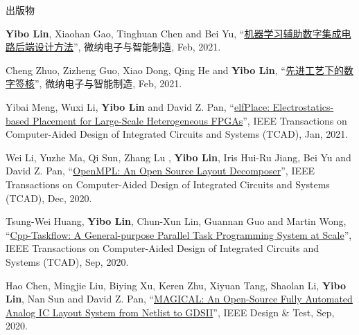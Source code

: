 \begin{rSection}{出版物}
\begin{description}[font=\normalfont, rightmargin=2em]
{}
            

\item[{[J29]}]{
        \textbf{Yibo Lin}, Xiaohan Gao, Tinghuan Chen and Bei Yu, 
    ``\href{https://doi.org/10.19816/j.cnki.10-1594/tn.2021.02.011}{机器学习辅助数字集成电路后端设计方法}'', 
    微纳电子与智能制造, Feb, 2021.
    
}
            

\item[{[J28]}]{
        Cheng Zhuo, Zizheng Guo, Xiao Dong, Qing He and \textbf{Yibo Lin}, 
    ``\href{https://doi.org/ 10.19816/j.cnki.10-1594/tn.2021.02.001}{先进工艺下的数字签核}'', 
    微纳电子与智能制造, Feb, 2021.
    
}
            

\item[{[J27]}]{
        Yibai Meng, Wuxi Li, \textbf{Yibo Lin} and David Z. Pan, 
    ``\href{https://doi.org/10.1109/TCAD.2021.3053191}{elfPlace: Electrostatics-based Placement for Large-Scale Heterogeneous FPGAs}'', 
    IEEE Transactions on Computer-Aided Design of Integrated Circuits and Systems (TCAD), Jan, 2021.
    
}
            

\item[{[J26]}]{
        Wei Li, Yuzhe Ma, Qi Sun,  Zhang Lu , \textbf{Yibo Lin}, Iris Hui-Ru Jiang, Bei Yu and David Z. Pan, 
    ``\href{https://doi.org/10.1109/TCAD.2020.3042175}{OpenMPL: An Open Source Layout Decomposer}'', 
    IEEE Transactions on Computer-Aided Design of Integrated Circuits and Systems (TCAD), Dec, 2020.
    
}
            

\item[{[J25]}]{
        Tsung-Wei Huang, \textbf{Yibo Lin}, Chun-Xun Lin, Guannan Guo and Martin Wong, 
    ``\href{https://doi.org/10.1109/TCAD.2021.3082507}{Cpp-Taskflow: A General-purpose Parallel Task Programming System at Scale}'', 
    IEEE Transactions on Computer-Aided Design of Integrated Circuits and Systems (TCAD), Sep, 2020.
    
}
            

\item[{[J24]}]{
        Hao Chen, Mingjie Liu, Biying Xu, Keren Zhu, Xiyuan Tang, Shaolan Li, \textbf{Yibo Lin}, Nan Sun and David Z. Pan, 
    ``\href{https://doi.org/10.1109/MDAT.2020.3024153}{MAGICAL: An Open-Source Fully Automated Analog IC Layout System from Netlist to GDSII}'', 
    IEEE Design \& Test, Sep, 2020.
    
}
\end{description}
\end{rSection}
